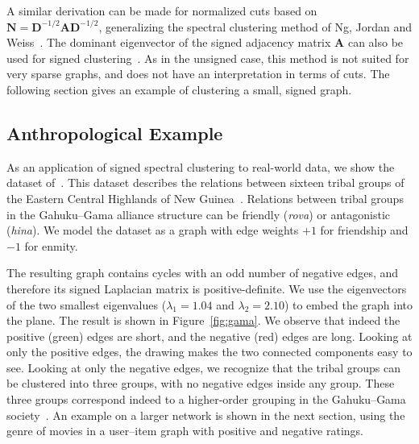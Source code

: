 \documentclass[11pt,a4paper]{book}
\begin{document}
A similar derivation can be made for normalized cuts based on $\mathbf N
= \mathbf
D^{-1/2}\mathbf A\mathbf D^{-1/2}$, generalizing the spectral
clustering method of 
Ng, Jordan and Weiss~\cite{b453}.
The dominant eigenvector of the signed adjacency matrix $\mathbf A$ can
also be used for signed clustering~\cite{b661}.  As in the unsigned
case, this method is not suited for very sparse graphs, and does not
have an interpretation in terms of cuts. 
The following section gives an example of clustering a small, signed
graph. 

\subsection{Anthropological Example}
As an application of signed spectral clustering to real-world data, we
show the dataset of~\cite{b322}.  
This dataset describes the relations between sixteen tribal groups of
the Eastern Central Highlands of New Guinea~\cite{b323}.
Relations between tribal groups in the Gahuku--Gama alliance structure
can be friendly (\emph{rova}) or antagonistic (\emph{hina}).
We model the dataset as a graph with edge weights 
$+1$ for friendship and $-1$ for enmity. 

The resulting graph contains cycles with an odd number of negative edges, and
therefore its signed Laplacian matrix is positive-definite.
We use the eigenvectors of the two smallest eigenvalues ($\lambda_1 = 1.04$ and
$\lambda_2 = 2.10$) to embed the graph into the plane.  The result is shown in
Figure~\ref{fig:gama}. 
We observe that indeed the positive (green) edges are short, and the
negative (red) edges are long.
Looking at only the positive edges, the drawing makes the two connected
components easy to see.
Looking at only the negative edges, we recognize that the tribal groups
can be clustered into three groups, with no negative edges inside 
any group. 
These three groups correspond indeed to a higher-order grouping in the
Gahuku--Gama society~\cite{b323}.  An example on a larger network is shown
in the next section, using the genre of movies in a user--item graph
with positive and negative ratings. 
\end{document}
